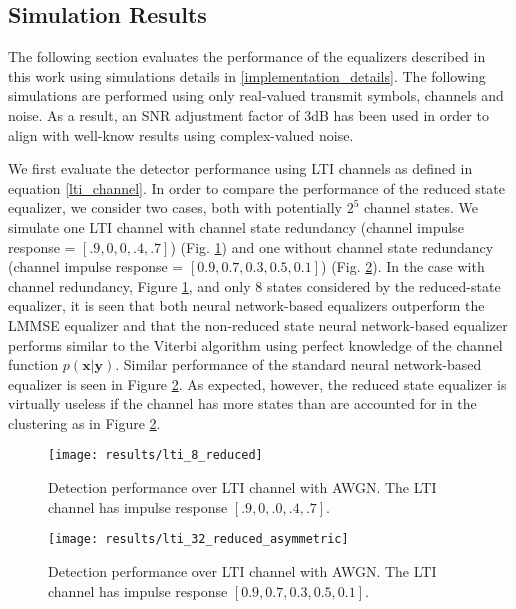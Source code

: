 \subsection{Simulation Results}\label{real_results}
The following section evaluates the performance of the equalizers described in this work using simulations details in \ref{implementation_details}. 
The following simulations are performed using only real-valued transmit symbols, channels and noise. As a result, an SNR adjustment factor of 3dB has been used in order to align with well-know results using complex-valued noise. 
\par
We first evaluate the detector performance using LTI channels as defined in equation \eqref{lti_channel}. In order to compare the performance of the reduced state equalizer, we consider two cases, both with potentially $2^5$ channel states. We simulate one LTI channel with channel state redundancy (channel impulse response = $[.9, 0, 0, .4, .7]$) (Fig. \ref{fig:LTI performance redundant}) and one without channel state redundancy (channel impulse response = $[0.9, 0.7, 0.3, 0.5, 0.1]$) (Fig. \ref{fig:LTI performance}). In the case with channel redundancy, Figure \ref{fig:LTI performance redundant}, and only 8 states considered by the reduced-state equalizer, it is seen that both neural network-based equalizers outperform the LMMSE equalizer and that the non-reduced state neural network-based equalizer performs similar to the Viterbi algorithm using perfect knowledge of the channel function $p(\mathbf{x}|\mathbf{y})$. Similar performance of the standard neural network-based equalizer is seen in  Figure \ref{fig:LTI performance}. As expected, however, the reduced state equalizer is virtually useless if the channel has more states than are accounted for in the clustering as in Figure \ref{fig:LTI performance}.
\begin{figure}[H]
	\texttt{[image: results/lti\_8\_reduced]}
		  \caption{Detection performance over LTI channel with AWGN. The LTI channel has impulse response  $[.9, 0, .0, .4, .7]$.}
	  \label{fig:LTI performance redundant}
\end{figure}
\begin{figure}[H]
	\texttt{[image: results/lti\_32\_reduced\_asymmetric]}
		  \caption{Detection performance over LTI channel with AWGN.  The LTI channel has impulse response  $[0.9, 0.7, 0.3, 0.5, 0.1]$.}
	  	  \label{fig:LTI performance}

\end{figure}
